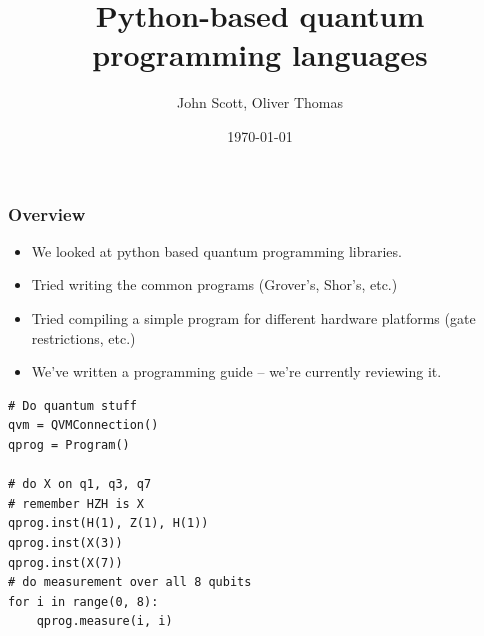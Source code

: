 \documentclass{beamer}
\title{Python-based quantum programming languages}
\author{John Scott, Oliver Thomas}
\institute{Quantum Engineering CDT \\ University of Bristol}
\date{\today}
\begin{document}
\frame{\titlepage}

\begin{frame}[fragile]
\frametitle{Overview}
\begin{minipage}{0.52\textwidth}
\begin{itemize}
    \item We looked at python based quantum programming libraries.
    \item Tried writing the common programs (Grover's, Shor's, etc.)
    \item Tried compiling a simple program for different hardware platforms (gate restrictions, etc.)
    \item We've written a programming guide -- we're currently reviewing it.
\end{itemize}
\end{minipage} \hfill
%
\begin{minipage}{0.44\textwidth}
 \begin{verbatim}
# Do quantum stuff  
qvm = QVMConnection() 
qprog = Program() 

# do X on q1, q3, q7 
# remember HZH is X 
qprog.inst(H(1), Z(1), H(1)) 
qprog.inst(X(3)) 
qprog.inst(X(7)) 
# do measurement over all 8 qubits 
for i in range(0, 8): 
    qprog.measure(i, i) 
  \end{verbatim}
  \end{minipage}
\end{frame}
\end{document}
